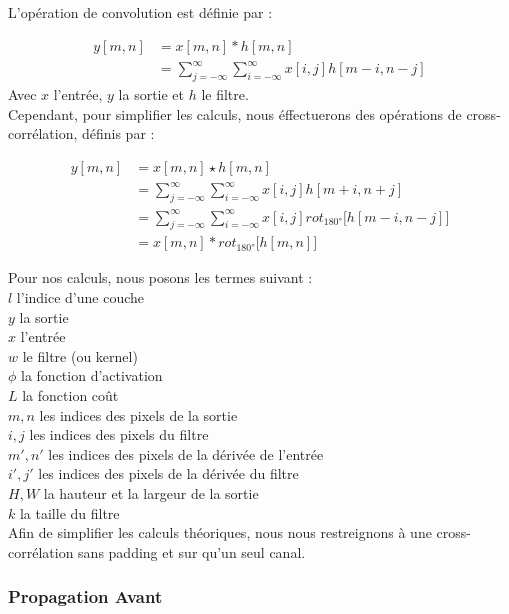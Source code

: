\begin{multicols}{2}
L'opération de convolution est définie par : 

\begin{align}
y[m,n] &= x[m,n] * h[m,n]\\
&=\sum^{\infty }_{j=-\infty}\sum^{\infty }_{i=-\infty}x[i,j]h[m-i,n-j]
\end{align}
Avec $x$ l'entrée, $y$ la sortie et $h$ le filtre.\\

Cependant, pour simplifier les calculs, nous éffectuerons des opérations de cross-corrélation, définis par : 

\begin{align}
    y[m,n] &= x[m,n] \star h[m,n]\\
    &=\sum^{\infty }_{j=-\infty}\sum^{\infty }_{i=-\infty}x[i,j]h[m+i,n+j]\\
    &= \sum^{\infty }_{j=-\infty}\sum^{\infty }_{i=-\infty}x[i,j] rot_{\ang{180}}\big[h[m-i,n-j]\big] \\
    &= x[m,n] * rot_{\ang{180}} \big[h[m,n]\big] 
\end{align}

Pour nos calculs, nous posons les termes suivant : \\

$l$ l'indice d'une couche\\
$y$ la sortie\\
$x$ l'entrée\\
$w$ le filtre (ou kernel) \\
$\phi$ la fonction d'activation\\
$L$ la fonction coût\\
$m,n$ les indices des pixels de la sortie\\
$i,j$ les indices des pixels du filtre\\
$m',n'$ les indices des pixels de la dérivée de l'entrée\\
$i',j'$ les indices des pixels de la dérivée du filtre\\
$H,W$ la hauteur et la largeur de la sortie\\
$k$ la taille du filtre \\

Afin de simplifier les calculs théoriques, nous nous restreignons à une 
cross-corrélation sans padding et sur qu'un seul canal. \\

\subsubsection{Propagation Avant}


\end{multicols}
